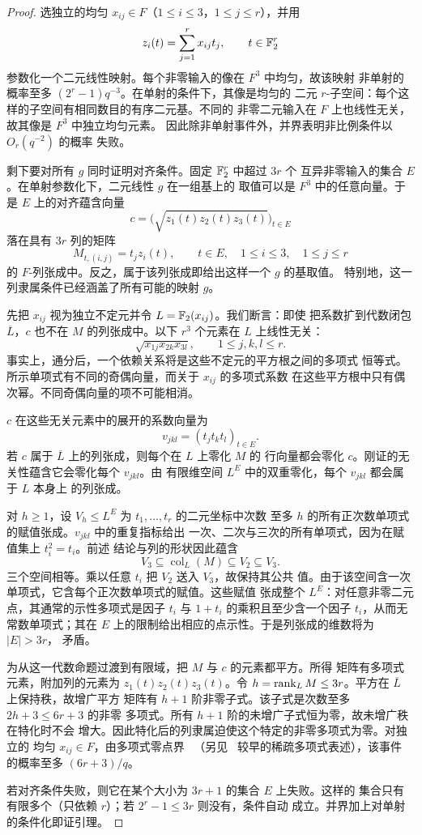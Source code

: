 \begin{proof}
选独立的均匀 $x_{ij}\in F$（$1\le i\le3$，$1\le j\le r$），并用
\[
 z_i(t)=\sum_{j=1}^r x_{ij}t_j,
 \qquad t\in\mathbb F_2^r
\]
参数化一个二元线性映射。每个非零输入的像在 $F^3$ 中均匀，故该映射
非单射的概率至多 $(2^r-1)q^{-3}$。在单射的条件下，其像是均匀的
二元 $r$-子空间：每个这样的子空间有相同数目的有序二元基。不同的
非零二元输入在 $F$ 上也线性无关，故其像是 $F^3$ 中独立均匀元素。
因此除非单射事件外，并界表明非比例条件以 $O_r(q^{-2})$ 的概率
失败。

剩下要对所有 $g$ 同时证明对齐条件。固定 $\mathbb F_2^r$ 中超过 $3r$ 个
互异非零输入的集合 $E$。在单射参数化下，二元线性 $g$ 在一组基上的
取值可以是 $F^3$ 中的任意向量。于是 $E$ 上的对齐蕴含向量
\[
 c=\bigl(\sqrt{z_1(t)z_2(t)z_3(t)}\bigr)_{t\in E}
\]
落在具有 $3r$ 列的矩阵
\[
 M_{t,(i,j)}=t_jz_i(t),
 \qquad t\in E,\quad 1\le i\le3,\quad 1\le j\le r
\]
的 $F$-列张成中。反之，属于该列张成即给出这样一个 $g$ 的基取值。
特别地，这一列隶属条件已经涵盖了所有可能的映射 $g$。

先把 $x_{ij}$ 视为独立不定元并令 $L=\mathbb F_2(x_{ij})$。我们断言：即使
把系数扩到代数闭包 $\overline L$，$c$ 也不在 $M$ 的列张成中。以下
$r^3$ 个元素在 $L$ 上线性无关：
\[
 \sqrt{x_{1j}x_{2k}x_{3l}},
 \qquad 1\le j,k,l\le r.
\]
事实上，通分后，一个依赖关系将是这些不定元的平方根之间的多项式
恒等式。所示单项式有不同的奇偶向量，而关于 $x_{ij}$ 的多项式系数
在这些平方根中只有偶次幂。不同奇偶向量的项不可能相消。

$c$ 在这些无关元素中的展开的系数向量为
\[
 v_{jkl}=(t_jt_kt_l)_{t\in E}.
\]
若 $c$ 属于 $\overline L$ 上的列张成，则每个在 $L$ 上零化 $M$ 的
行向量都会零化 $c$。刚证的无关性蕴含它会零化每个 $v_{jkl}$。由
有限维空间 $L^E$ 中的双重零化，每个 $v_{jkl}$ 都会属于 $L$ 本身上
的列张成。

对 $h\ge1$，设 $V_h\le L^E$ 为 $t_1,\ldots,t_r$ 的二元坐标中次数
至多 $h$ 的所有正次数单项式的赋值张成。$v_{jkl}$ 中的重复指标给出
一次、二次与三次的所有单项式，因为在赋值集上 $t_i^2=t_i$。前述
结论与列的形状因此蕴含
\[
 V_3\subseteq\operatorname{col}_L(M)\subseteq V_2\subseteq V_3.
\]
三个空间相等。乘以任意 $t_i$ 把 $V_2$ 送入 $V_3$，故保持其公共
值。由于该空间含一次单项式，它含每个正次数单项式的赋值。这些赋值
张成整个 $L^E$：对任意非零二元点，其通常的示性多项式是因子 $t_i$
与 $1+t_i$ 的乘积且至少含一个因子 $t_i$，从而无常数单项式；其在
$E$ 上的限制给出相应的点示性。于是列张成的维数将为 $|E|>3r$，
矛盾。

为从这一代数命题过渡到有限域，把 $M$ 与 $c$ 的元素都平方。所得
矩阵有多项式元素，附加列的元素为 $z_1(t)z_2(t)z_3(t)$。令
$h=\operatorname{rank}_L M\le3r$。平方在 $\overline L$ 上保持秩，故增广平方
矩阵有 $h+1$ 阶非零子式。该子式是次数至多 $2h+3\le6r+3$ 的非零
多项式。所有 $h+1$ 阶的未增广子式恒为零，故未增广秩在特化时不会
增大。因此特化后的列隶属迫使这个特定的非零多项式为零。对独立的
均匀 $x_{ij}\in F$，由多项式零点界~\cite[Corollary~1]{Schwartz80}
（另见~\cite[Section~3.1]{Zippel79} 较早的稀疏多项式表述），该事件
的概率至多 $(6r+3)/q$。

若对齐条件失败，则它在某个大小为 $3r+1$ 的集合 $E$ 上失败。这样的
集合只有有限多个（只依赖 $r$）；若 $2^r-1\le3r$ 则没有，条件自动
成立。并界加上对单射的条件化即证引理。
\end{proof}

